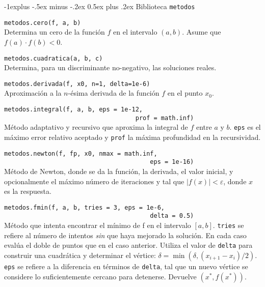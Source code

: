 \documentclass[10pt,landscape]{article}
\makeatletter
\renewcommand{\subsection}{\@startsection{subsection}{2}{0mm}%
                                {-1explus -.5ex minus -.2ex}%
                                {0.5ex plus .2ex}%
                                {\normalfont\normalsize\bfseries}}
\makeatother
\begin{document}
\begin{multicols}{3}
\subsection{Biblioteca \texttt{metodos}}


\begin{asparaitem}
\item \verb|metodos.cero(f, a, b)| \\
  Determina un cero de la funci\'on $f$ en el intervalo $(a, b)$. Asume que $f(a)\cdot f(b) < 0$.

\item \verb|metodos.cuadratica(a, b, c)|\\
  \quad Determina, para un discriminante no-negativo, las soluciones reales.

\item \verb|metodos.derivada(f, x0, n=1, delta=1e-6)| \\
  \quad Aproximaci\'on a la $n$-\'esima derivada de la funci\'on $f$ en el punto $x_0$.

\item \verb|metodos.integral(f, a, b, eps = 1e-12,|\\
  \verb|                                    prof = math.inf)| \\
  \quad M\'etodo adaptativo y recursivo que aproxima la integral de $f$ entre $a$ y $b$. \verb|eps| es el m\'aximo error relativo aceptado y \verb|prof| la m\'axima profundidad en la recursividad.

\item \verb|metodos.newton(f, fp, x0, nmax = math.inf,|\\
  \verb|                                        eps = 1e-16)|\\
  \quad M\'etodo de Newton, donde se da la funci\'on, la derivada, el valor inicial, y opcionalmente el m\'aximo n\'umero de iteraciones y tal que $|f(x)|<\varepsilon$, donde $x$ es la respuesta.

\item \verb|metodos.fmin(f, a, b, tries = 3, eps = 1e-6,|\\
  \verb|                                        delta = 0.5)| \\
  \quad M\'etodo que intenta encontrar el m\'inimo de f en el intervalo $[a, b]$. \verb|tries| se refiere al n\'umero de intentos \emph{sin} que haya mejorado la soluci\'on. En cada caso eval\'ua el doble de puntos que en el caso anterior. Utiliza el valor de \verb|delta| para construir una cuadr\'atica y determinar el v\'ertice: $\delta = \min(\delta, (x_{i+1}-x_i)/2)$. \verb|eps| se refiere a la diferencia en t\'erminos de \verb|delta|, tal que un nuevo v\'ertice se considere lo suficientemente cercano para detenerse. Devuelve $(x^*, f(x^*))$.
\end{asparaitem}



\end{multicols}
\end{document}
